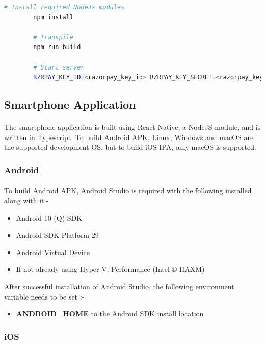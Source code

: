 \documentclass{article}
\begin{document}
        \begin{lstlisting}[language=bash, caption=\gls{lrrs} Server]
        # Install required NodeJs modules
        npm install
    
        # Transpile
        npm run build
    
        # Start server
        RZRPAY_KEY_ID=<razorpay_key_id> RZRPAY_KEY_SECRET=<razorpay_key_secret> node dist/main.js
        \end{lstlisting}
    
    \subsection{Smartphone Application}
        \paragraph{}
        The smartphone application is built using React Native, a NodeJS module, and is written in Typescript. To build Android APK, Linux, Windows and macOS are the supported development OS, but to build iOS IPA, only macOS is supported.
        \subsubsection{Android}
            \paragraph{}
            To build Android APK, Android Studio is required with the following installed along with it:- 
            \begin{itemize}
                \item Android 10 (Q) SDK
                \item Android SDK Platform 29
                \item Android Virtual Device
                \item If not already using Hyper-V: Performance (Intel ® HAXM)
            \end{itemize}
            After successful installation of Android Studio, the following environment variable needs to be set :-
            \begin{itemize}
                \item \textbf{ANDROID\_HOME} to the Android SDK install location
            \end{itemize}
        
        \subsubsection{iOS}
\end{document}
